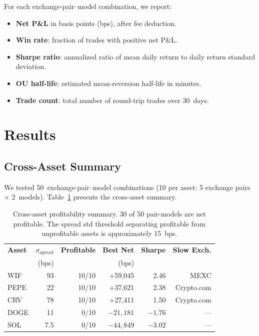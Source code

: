 \documentclass[sigconf,nonacm=false]{acmart}
\begin{document}
For each exchange-pair--model combination, we report:
\begin{itemize}
    \item \textbf{Net P\&L} in basis points (bps), after fee deduction.
    \item \textbf{Win rate}: fraction of trades with positive net P\&L.
    \item \textbf{Sharpe ratio}: annualized ratio of mean daily return to daily return standard deviation.
    \item \textbf{OU half-life}: estimated mean-reversion half-life in minutes.
    \item \textbf{Trade count}: total number of round-trip trades over 30~days.
\end{itemize}

\section{Results}\label{sec:results}

\subsection{Cross-Asset Summary}

We tested 50~exchange-pair--model combinations (10 per asset: 5 exchange pairs $\times$ 2~models). Table~\ref{tab:summary} presents the cross-asset summary.

\begin{table}[h]
\caption{Cross-asset profitability summary. 30 of 50 pair-models are net profitable. The spread std threshold separating profitable from unprofitable assets is approximately 15~bps.}
\label{tab:summary}
\begin{tabular}{lrrrrr}
\toprule
\textbf{Asset} & $\sigma_{\text{spread}}$ & \textbf{Profitable} & \textbf{Best Net} & \textbf{Sharpe} & \textbf{Slow Exch.} \\
 & (bps) & & (bps) & & \\
\midrule
WIF  & 93   & 10/10 & +59,045 & 2.46 & MEXC \\
PEPE & 22   & 10/10 & +37,621 & 2.38 & Crypto.com \\
CRV  & 78   & 10/10 & +27,411 & 1.50 & Crypto.com \\
DOGE & 11   & 0/10  & $-21{,}181$ & $-1.76$ & --- \\
SOL  & 7.5  & 0/10  & $-44{,}849$ & $-3.02$ & --- \\
\bottomrule
\end{tabular}
\end{table}
\end{document}
